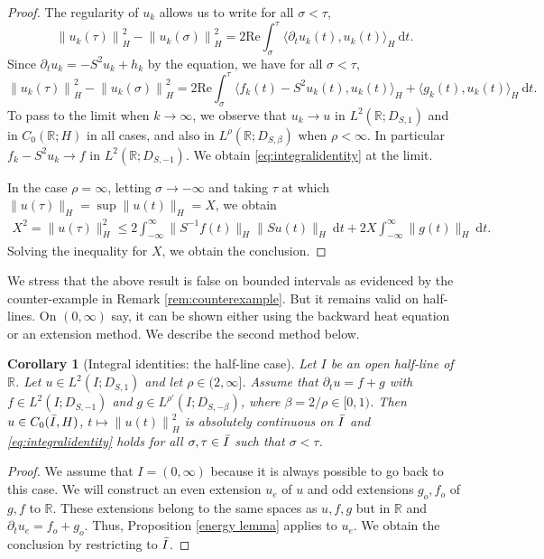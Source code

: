 \documentclass[11pt, letterpaper]{amsart}
\newtheorem{cor}[thm]{Corollary}
\theoremstyle{definition}
\theoremstyle{remark}
\numberwithin{equation}{section}
\begin{document}
{\begin{proof}
The regularity of $u_k$ allows us to write for all $ \sigma < \tau $,
\begin{equation*}
    \left \| u_k (\tau) \right \|^2_H-\left \| u_k (\sigma) \right \|^2_H = 2 \mathrm{Re}\int_{\sigma}^{\tau} \langle \partial_t u_k (t),u_k (t)\rangle_H \ \mathrm d t.
\end{equation*}
Since $ \partial_t u_k=-S^2u_k+h_k$ by the equation, we have  for all $ \sigma < \tau $,
\begin{equation*}
    \left \| u_k (\tau) \right \|^2_H-\left \| u_k (\sigma) \right \|^2_H = 2 \mathrm{Re}\int_{\sigma}^{\tau} \langle f_k (t)-S^2u_k (t),u_k (t)\rangle_H + \langle g_k(t), u_k(t) \rangle_H \ \mathrm{d}t.
\end{equation*}
To pass to the limit when $k\to \infty$, we observe that  $u_k\to u$ in $L^2(\mathbb{R};D_{S,1})$ and in $C_0(\mathbb{R};H)$ in all cases, and also in $L^\rho(\mathbb{R};D_{S,\beta})$ when $\rho<\infty$. In particular $f_k-S^2u_k \to f$ in $L^2(\mathbb{R};D_{S,-1})$. We obtain \eqref{eq:integralidentity} at the limit.

In the case $\rho=\infty$, letting $\sigma\to -\infty$ and taking $\tau$ at which $\|u(\tau) \|_H=\sup\|u(t)\|_{H}=X$, we obtain 
\begin{align*}
        X^2= \|u(\tau) \|_H^2 \le 2\int_{-\infty}^{\infty}  \|S^{-1}f(t)\|_H\|Su(t)\|_{H} \  \mathrm d t+ 2X\int_{-\infty}^{\infty}  \| g(t)\|_H\  \mathrm d t .
    \end{align*}
Solving the inequality for $X$, we obtain the conclusion.
\end{proof}



We stress that the above result is false on bounded intervals as evidenced by the counter-example in Remark \ref{rem:counterexample}. But it remains valid on half-lines. On $(0,\infty)$ say, it can be shown either using the backward heat equation or an extension method. We describe the second method below.


\begin{cor}[Integral identities: the half-line case]\label{corenergy}
    Let $I$ be an open half-line of $\mathbb{R}$. Let $u \in L^2(I;D_{S,1})$ and let $\rho \in (2,\infty]$. Assume that $\partial_t u =  f+g$ with $f \in L^2(I;D_{S,-1})$ and 
     $g \in L^{\rho'}(I;D_{S,-{\beta}})$, where ${\beta}={2}/{\rho} \in [0,1)$. Then $ u \in C_0(\Bar{I},H)$, $ t \mapsto \left \| u(t) \right \|^2_H$ is absolutely continuous on $\Bar{I}$ and \eqref{eq:integralidentity} holds for all $ \sigma, \tau \in \Bar{I}$ such that $  \sigma < \tau$.
\end{cor}
\begin{proof}
We assume that $I=(0,\infty)$ because it is always possible to go back to this case. We will construct an even extension $u_e$ of $u$ and odd extensions $g_o,f_o$ of $g, f$  to  $\mathbb{R}$.   These extensions belong to the same spaces  as $u,f,g$ but in $\mathbb{R}$ and  $\partial_t u_e =  f_o+g_o$. Thus, Proposition \ref{energy lemma} applies to ${u_e}$. We obtain the conclusion by restricting to $\Bar I$.


\end{proof}}
\end{document}
